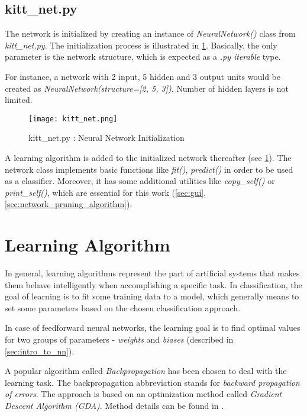 \subsection*{kitt\_net.py} \label{ssec:kitt_net}
The network is initialized by creating an instance of \textit{NeuralNetwork()} class from \textit{kitt\_net.py}. The initialization process is illustrated in \cref{img:kitt_net}. Basically, the only parameter is the network structure, which is expected as a \textit{.py iterable} type. 

For instance, a network with 2 input, 5 hidden and 3 output units would be created as \textit{NeuralNetwork(structure=[2, 5, 3])}. Number of hidden layers is not limited.

\begin{figure}[H]
  \centering
  \texttt{[image: kitt\_net.png]}
  \caption{kitt\_net.py : Neural Network Initialization}
  \label{img:kitt_net}
\end{figure}

A learning algorithm is added to the initialized network thereafter (see \cref{sec:learning_algorithm}). The network class implements basic functions like \textit{fit()}, \textit{predict()} in order to be used as a classifier. Moreover, it has some additional utilities like \textit{copy\_self()} or \textit{print\_self()}, which are essential for this work (\cref{sec:gui}, \cref{sec:network_pruning_algorithm}).

\newpage
\section{Learning Algorithm} \label{sec:learning_algorithm}
In general, learning algorithms represent the part of artificial systems that makes them behave intelligently when accomplishing a specific task. In classification, the goal of learning is to fit some training data to a model, which generally means to set some parameters based on the chosen classification approach.

In case of feedforward neural networks, the learning goal is to find optimal values for two groups of parameters - \textit{weights} and \textit{biases} (described in \cref{sec:intro_to_nn}).

A popular algorithm called \textit{Backpropagation} has been chosen to deal with the learning task. The backpropagation abbreviation stands for \textit{backward propagation of errors}. The approach is based on an optimization method called \textit{Gradient Descent Algorithm (GDA)}. Method details can be found in \citep{online:nn_demystified}.

